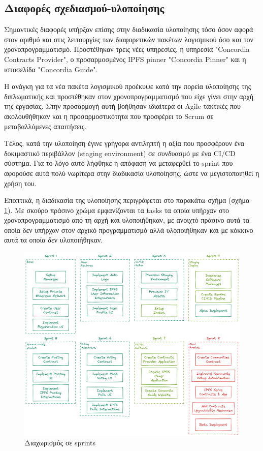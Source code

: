 \subsection{Διαφορές σχεδιασμού-υλοποίησης} \label{subsection:4-5-1-design-implementation-differences}

Σημαντικές διαφορές υπήρξαν επίσης στην διαδικασία υλοποίησης τόσο όσον αφορά στον αριθμό και στις λειτουργίες των διαφορετικών πακέτων λογισμικού όσο και τον χρονοπρογραμματισμό. Προστέθηκαν τρεις νέες υπηρεσίες, η υπηρεσία "Concordia Contracts Provider", ο προσαρμοσμένος IPFS pinner "Concordia Pinner" και η ιστοσελίδα "Concordia Guide".

Η ανάγκη για τα νέα πακέτα λογισμικού προέκυψε κατά την πορεία υλοποίησης της διπλωματικής και προστέθηκαν στον χρονοπρογραμματισμό που είχε γίνει στην αρχή της εργασίας. Στην προσαρμογή αυτή βοήθησαν ιδιαίτερα οι Agile τακτικές που ακολουθήθηκαν και η προσαρμοστικότητα που προσφέρει το Scrum σε μεταβαλλόμενες απαιτήσεις.

Τέλος, κατά την υλοποίηση έγινε γρήγορα αντιληπτή η αξία που προσφέρουν ένα δοκιμαστικό περιβάλλον (staging environment) σε συνδυασμό με ένα CI/CD σύστημα. Για το λόγο αυτό λήφθηκε η απόφαση να μεταφερθεί το sprint που αφορούσε αυτά πολύ νωρίτερα στην διαδικασία υλοποίησης, ώστε να μεγιστοποιηθεί η χρήση του.

Εποπτικά, η διαδικασία της υλοποίησης περιγράφεται στο παρακάτω σχήμα (σχήμα \ref{figure:4.5.design-implementation-differences-sprints}). Με σκούρο πράσινο χρώμα εμφανίζονται τα tasks τα οποία υπήρχαν στο χρονοπρογραμματισμό από τη αρχή και υλοποιήθηκαν, με ανοιχτό πράσινο αυτά τα οποία δεν υπήρχαν στον αρχικό προγραμματισμό αλλά υλοποιήθηκαν και με κόκκινο αυτά τα οποία δεν υλοποιήθηκαν.

\begin{figure}[H]
    \centering
    \includegraphics[width=\textwidth]{assets/figures/chapter-4/4.6.design-implementation-differences-sprints.png}
    \caption{Διαχωρισμός σε sprints}
    \label{figure:4.5.design-implementation-differences-sprints}
\end{figure}
